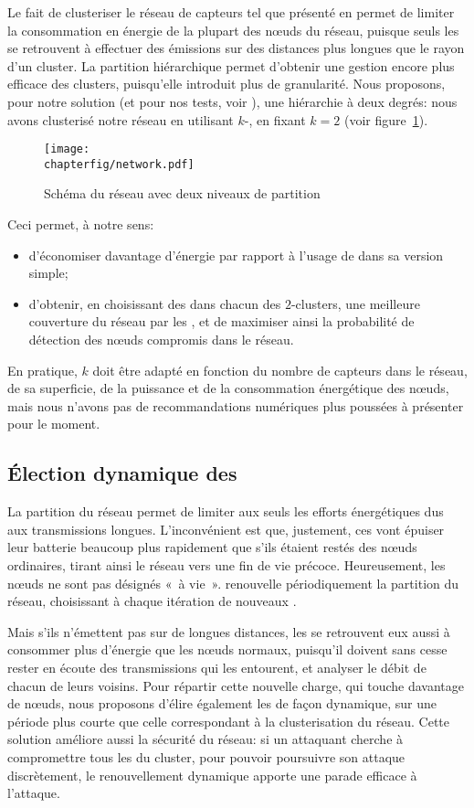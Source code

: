 Le fait de clusteriser le réseau de capteurs tel que présenté en  permet de limiter la consommation en énergie de la plupart des nœuds du réseau, puisque seuls les \chs se retrouvent à effectuer des émissions sur des distances plus longues que le rayon d'un cluster.
La partition hiérarchique permet d'obtenir une gestion encore plus efficace des clusters, puisqu'elle introduit plus de granularité.
Nous proposons, pour notre solution (et pour nos tests, voir ), une hiérarchie à deux degrés: nous avons clusterisé notre réseau en utilisant $k$-\leach, en fixant $k=2$ (voir figure~\ref{sa:fig:network}).
\begin{figure}[ht]
    \centering
    \texttt{[image: \\chapterfig/network.pdf]}
    \caption{Schéma du réseau avec deux niveaux de partition}\label{sa:fig:network}
\end{figure}
Ceci permet, à notre sens:
\begin{itemize}
    \item d'économiser davantage d'énergie par rapport à l'usage de \leach dans sa version simple;
    \item d'obtenir, en choisissant des \cns dans chacun des $2$-clusters, une meilleure couverture du réseau par les \cns, et de maximiser ainsi la probabilité de détection des nœuds compromis dans le réseau.
\end{itemize}
En pratique, $k$ doit être adapté en fonction du nombre de capteurs dans le réseau, de sa superficie, de la puissance et de la consommation énergétique des nœuds, mais nous n'avons pas de recommandations numériques plus poussées à présenter pour le moment.

    \subsection{Élection dynamique des \cns}

La partition du réseau permet de limiter aux seuls \chs les efforts énergétiques dus aux transmissions longues.
L'inconvénient est que, justement, ces \CH vont épuiser leur batterie beaucoup plus rapidement que s'ils étaient restés des nœuds ordinaires, tirant ainsi le réseau vers une fin de vie précoce.
Heureusement, les nœuds ne sont pas désignés \CH «~à vie~».
\leach renouvelle périodiquement la partition du réseau, choisissant à chaque itération de nouveaux \chs.

Mais s'ils n'émettent pas sur de longues distances, les \cns se retrouvent eux aussi à consommer plus d'énergie que les nœuds normaux, puisqu'il doivent sans cesse rester en écoute des transmissions qui les entourent, et analyser le débit de chacun de leurs voisins.
Pour répartir cette nouvelle charge, qui touche davantage de nœuds, nous proposons d'élire également les \cns de façon dynamique, sur une période plus courte que celle correspondant à la clusterisation du réseau.
Cette solution améliore aussi la sécurité du réseau: si un attaquant cherche à compromettre tous les \cns du cluster, pour pouvoir poursuivre son attaque discrètement, le renouvellement dynamique apporte une parade efficace à l'attaque.

